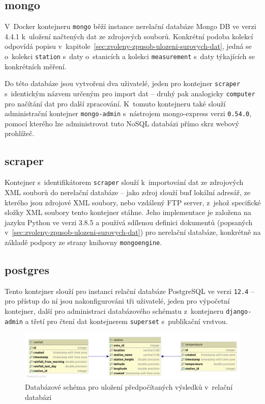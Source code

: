 \documentclass[10pt,a4paper,titlepage]{extarticle}
\begin{document}
    \subsection{mongo}
    V~Docker kontejneru \texttt{mongo} běží instance nerelační databáze Mongo DB ve verzi 4.4.1 k~uložení načtených dat
    ze zdrojových souborů. Konkrétní podoba kolekcí odpovídá popisu v~kapitole~\ref{sec:zvoleny-zpusob-ulozeni-surovych-dat},
    jedná se o~kolekci \texttt{station} s~daty o~stanicích a kolekci \texttt{measurement} s~daty týkajících se konkrétních
    měření.

    Do této databáze jsou vytvořeni dva uživatelé, jeden pro kontejner \texttt{scraper} s~identickým názvem určeným pro
    import dat -- druhý pak analogicky \texttt{computer} pro načítání dat pro další zpracování. K~tomuto kontejneru také
    slouží administrační kontejner \texttt{mongo-admin} s~nástrojem mongo-express verzi \texttt{0.54.0}, pomocí kterého lze
    administrovat tuto NoSQL databázi přímo skrz webový prohlížeč.

    \subsection{scraper}

    Kontejner s~identifikátorem \texttt{scraper} slouží k~importování dat ze zdrojových XML souborů do nerelační databáze --
    jako zdroj slouží buď lokální adresář, ze kterého jsou zdrojové XML soubory, nebo vzdálený FTP server, z~jehož
    specifické složky XML soubory tento kontejner stáhne.
    Jeho implementace je založena na jazyku Python ve verzi 3.8.5 a
    používá sdílenou definici dokumentů (popsaných v~\ref{sec:zvoleny-zpusob-ulozeni-surovych-dat}) pro nerelační databáze,
    konkrétně na základě podpory ze strany knihovny \texttt{mongoengine}.

    \subsection{postgres}

    Tento kontejner slouží pro instanci relační databáze PostgreSQL ve verzi \texttt{12.4} -- pro přístup do ní jsou
    nakonfigurováni tři uživatelé, jeden pro výpočetní kontejner, další pro administraci databázového schématu
    z~kontejneru \texttt{django-admin} a třetí pro čtení dat kontejnerem \texttt{superset} s~publikační vrstvou.

    \begin{figure}[H]
        \centering
        \includegraphics[width=.9\textwidth]{django-er-diagram.png}
        \caption{Databázové schéma pro uložení předpočítaných výsledků v~relační databázi}
    \end{figure}
\end{document}
